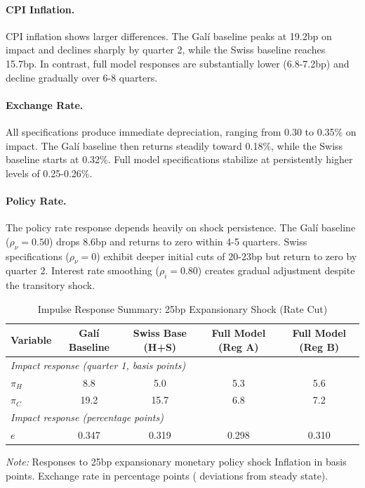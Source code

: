 \documentclass[12pt,a4paper]{article}
\begin{document}
\paragraph{CPI Inflation.}
CPI inflation shows larger differences. The Galí baseline peaks at 
19.2bp on impact and declines sharply by quarter 2, while the Swiss baseline 
reaches 15.7bp. In contrast, full model responses are substantially lower (6.8-7.2bp) and decline gradually over 6-8 quarters.

\paragraph{Exchange Rate.}
All specifications produce immediate depreciation, ranging from 0.30 to 0.35\% on impact. The Galí baseline then returns steadily toward 0.18\%, while the Swiss baseline starts at 0.32\%. Full model specifications stabilize at persistently higher levels of 0.25-0.26\%.

\paragraph{Policy Rate.}
The policy rate response depends heavily on shock persistence. The Galí baseline ($\rho_\nu = 0.50$) drops 8.6bp and returns to zero within 4-5 quarters. Swiss specifications ($\rho_\nu = 0$) exhibit deeper initial cuts of 20-23bp but return to zero by quarter 2. Interest rate smoothing ($\rho_i = 0.80$) creates gradual adjustment despite the transitory shock.

\begin{table}[h]
	\centering
	\caption{Impulse Response Summary: 25bp Expansionary Shock (Rate Cut)}
	\label{tab:impact_responses}
	\begin{tabular}{lcccc}
		\toprule
		Variable & Galí Baseline & Swiss Base (H+S) & Full Model (Reg A) & Full Model (Reg B) \\
		\midrule
		\multicolumn{5}{l}{\textit{Impact response (quarter 1, basis points)}} \\
		$\pi_H$ & 8.8 & 5.0 & 5.3 & 5.6 \\
		$\pi_C$ & 19.2 & 15.7 & 6.8 & 7.2 \\
		\multicolumn{5}{l}{\textit{Impact response (percentage points)}} \\
		$e$ & 0.347 & 0.319 & 0.298 & 0.310 \\
		\bottomrule
	\end{tabular}
	\begin{tablenotes}
		\footnotesize
		\item \textit{Note:} Responses to 25bp expansionary monetary policy shock 
		Inflation in basis points. Exchange rate in percentage points ( deviations from steady state).
	\end{tablenotes}
\end{table}
\newpage
\end{document}
